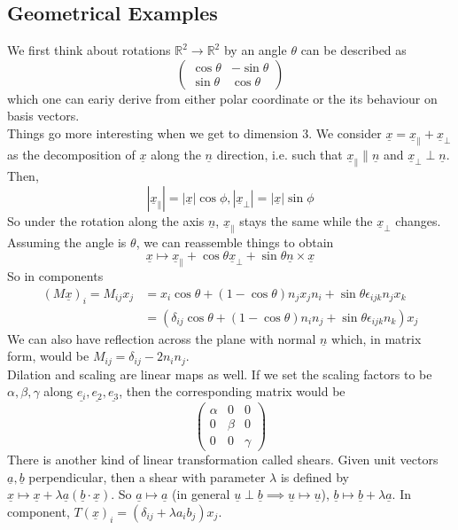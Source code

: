 \subsection{Geometrical Examples}
We first think about rotations $\mathbb R^2\to\mathbb R^2$ by an angle $\theta$ can be described as
$$
\begin{pmatrix}
    \cos\theta&-\sin\theta\\
    \sin\theta&\cos\theta
\end{pmatrix}
$$
which one can eariy derive from either polar coordinate or the its behaviour on basis vectors.\\
Things go more interesting when we get to dimension $3$.
We consider $\underline{x}=\underline{x}_\parallel+\underline{x}_\perp$ as the decomposition of $\underline{x}$ along the $\underline{n}$ direction, i.e. such that $\underline{x}_\parallel\parallel\underline{n}$ and $\underline{x}_\perp\perp\underline{n}$.
Then,
$$|\underline{x}_\parallel|=|\underline{x}|\cos\phi,|\underline{x}_\perp|=|\underline{x}|\sin\phi$$
So under the rotation along the axis $\underline{n}$, $\underline{x}_\parallel$ stays the same while the $\underline{x}_\perp$ changes.
Assuming the angle is $\theta$, we can reassemble things to obtain
$$\underline{x}\mapsto \underline{x}_\parallel+\cos\theta\underline{x}_\perp+\sin\theta\underline{n}\times\underline{x}$$
So in components
\begin{align*}
    (M\underline{x})_i=M_{ij}x_j&=x_i\cos\theta+(1-\cos\theta)n_jx_jn_i+\sin\theta\epsilon_{ijk}n_jx_k\\
    &=(\delta_{ij}\cos\theta+(1-\cos\theta)n_in_j+\sin\theta\epsilon_{ijk}n_k)x_j
\end{align*}
We can also have reflection across the plane with normal $\underline{n}$ which, in matrix form, would be $M_{ij}=\delta_{ij}-2n_in_j$.\\
Dilation and scaling are linear maps as well.
If we set the scaling factors to be $\alpha,\beta,\gamma$ along $\underline{e_i},\underline{e_2},\underline{e_3}$, then the corresponding matrix would be
$$
\begin{pmatrix}
    \alpha&0&0\\
    0&\beta&0\\
    0&0&\gamma
\end{pmatrix}
$$
There is another kind of linear transformation called shears.
Given unit vectors $\underline{a},\underline{b}$ perpendicular, then a shear with parameter $\lambda$ is defined by $\underline{x}\mapsto \underline{x}+\lambda\underline{a}(\underline{b}\cdot\underline{x})$.
So $\underline{a}\mapsto\underline{a}$ (in general $\underline{u}\perp\underline{b}\implies \underline{u}\mapsto\underline{u}$), $\underline{b}\mapsto\underline{b}+\lambda\underline{a}$.
In component, $T(\underline{x})_i=(\delta_{ij}+\lambda a_ib_j)x_j$.
